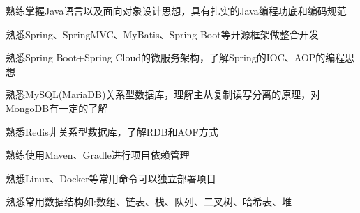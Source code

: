 

\begin{cventries}

  \cventry
    {} %
    {} %
    {} %
    {} %
    {
      \begin{cvitems} %
      	\item {熟练掌握Java语言以及面向对象设计思想，具有扎实的Java编程功底和编码规范}
      	\item {熟悉Spring、SpringMVC、MyBatis、Spring Boot等开源框架做整合开发}
        \item {熟悉Spring Boot+Spring Cloud的微服务架构，了解Spring的IOC、AOP的编程思想}
        \item {熟悉MySQL(MariaDB)关系型数据库，理解主从复制读写分离的原理，对MongoDB有一定的了解}
        \item {熟悉Redis非关系型数据库，了解RDB和AOF方式}
        \item {熟练使用Maven、Gradle进行项目依赖管理}
        \item {熟悉Linux、Docker等常用命令可以独立部署项目}
        \item {熟悉常用数据结构如:数组、链表、栈、队列、二叉树、哈希表、堆}
      \end{cvitems}
    }

\end{cventries}
